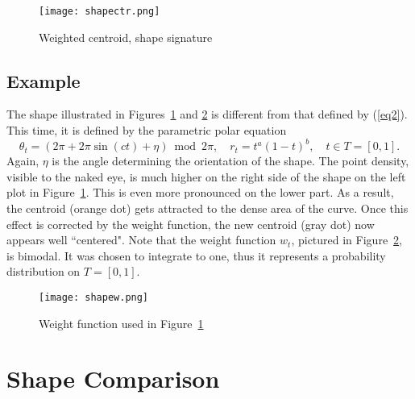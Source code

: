 \documentclass[oneside,10pt]{book}
\begin{document}
\begin{figure}%
\centering
\texttt{[image: shapectr.png]} %
\caption{Weighted centroid, shape signature}
\label{fig:ctr}
\end{figure}


\subsection{Example}

The shape illustrated in Figures~\ref{fig:ctr} and \ref{fig:3b} is different from that defined by (\ref{eq2}). This time, it is defined by the parametric polar equation
\begin{equation}
\theta_t=(2\pi + 2\pi \sin(ct)+\eta)\bmod{2\pi},\quad r_t=t^a(1-t)^b, \quad t \in T=[0, 1]. \label{eq2b}
\end{equation}
Again, $\eta$ is the angle determining the orientation of the shape. The point density, visible to the naked eye, is much higher on the right side of the shape on the left plot in Figure~\ref{fig:ctr}. This is even more pronounced on the lower part. As a result, the centroid (orange dot) gets attracted to the dense area of the curve. Once this effect is corrected by the weight function, the new centroid (gray dot) now appears well ``centered". Note that the weight function $w_t$, pictured in Figure~\ref{fig:3b}, is bimodal. It was chosen to integrate to one, thus it represents a probability distribution on
$T=[0, 1]$. 

\begin{figure}%
\centering
\texttt{[image: shapew.png]}  %
\caption{Weight function used in Figure~\ref{fig:ctr}}
\label{fig:3b}
\end{figure}


\section{Shape Comparison}\label{s4}
\end{document}

